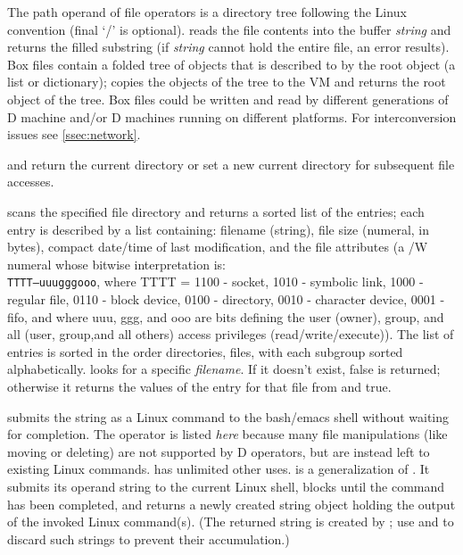 The path operand of file operators is a directory tree following the
Linux convention (final `/' is optional).  reads the file
contents into the buffer \emph{string} and returns the filled
substring (if \emph{string} cannot hold the entire file, an error
results). Box files contain a folded tree of objects that is described
to  by the root object (a list or dictionary);
 copies the objects of the tree to the VM and returns
the root object of the tree. Box files could be written and read by
different generations of D machine and/or D machines running on
different platforms. For interconversion issues see
\ref{ssec:network}.

 and  return the current directory or set a
new current directory for subsequent file accesses.

 scans the specified file directory and returns a sorted
list of the entries; each entry is described by a list containing:
filename (string), file size (numeral, in bytes), compact date/time of
last modification, and the file attributes (a /W numeral whose bitwise
interpretation is: \\\texttt {TTTT---uuugggooo}, where TTTT = 1100 -
socket, 1010 - symbolic link, 1000 - regular file, 0110 - block
device, 0100 - directory, 0010 - character device, 0001 - fifo, and
where uuu, ggg, and ooo are bits defining the user (owner), group, and
all (user, group,and all others) access privileges
(read/write/execute)). The list of entries is sorted in the order
directories, files, with each subgroup sorted
alphabetically.  looks for a specific \emph{filename}.
If it doesn't exist, false is returned; otherwise it returns the
values of the entry for that file from  and true.

 submits the string as a Linux command to the bash/emacs
shell without waiting for completion. The operator is listed
\emph{here} because many file manipulations (like moving or deleting)
are not supported by D operators, but are instead left to existing
Linux commands.  has unlimited other
uses.  is a generalization of . It submits
its operand string to the current Linux shell, blocks until the
command has been completed, and returns a newly created string object
holding the output of the invoked Linux command(s). (The returned
string is created by ; use  and 
to discard such strings to prevent their accumulation.)

